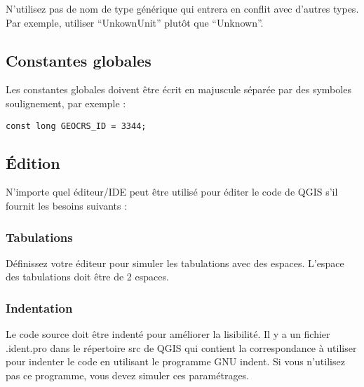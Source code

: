 N'utilisez pas de nom de type g\'en\'erique qui entrera en conflit avec d'autres types. Par exemple, utiliser ``UnkownUnit'' plut\^ot que ``Unknown''.

\subsection{Constantes globales}
Les constantes globales doivent \^etre \'ecrit en majuscule s\'epar\'ee par des symboles soulignement, par exemple :
\begin{verbatim}
const long GEOCRS_ID = 3344;
\end{verbatim}

\subsection{\'Edition}
N'importe quel \'editeur/IDE peut \^etre utilis\'e pour \'editer le code de QGIS s'il fournit les besoins suivants :

\subsubsection{Tabulations}
D\'efinissez votre \'editeur pour simuler les tabulations avec des espaces. L'espace des tabulations doit \^etre de 2 espaces.

\subsubsection{Indentation}
Le code source doit \^etre indent\'e pour am\'eliorer la lisibilit\'e. Il y a un fichier .ident.pro dans le r\'epertoire src de QGIS qui contient la correspondance \`a utiliser pour indenter le code en utilisant le programme GNU indent. Si vous n'utilisez pas ce programme, vous devez simuler ces param\'etrages.

